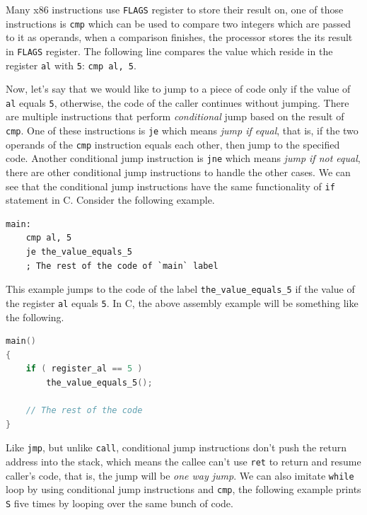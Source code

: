 Many x86 instructions use \lstinline!FLAGS! register to store their
result on, one of those instructions is \lstinline!cmp! which can be
used to compare two integers which are passed to it as operands, when a
comparison finishes, the processor stores the its result in
\lstinline!FLAGS! register. The following line compares the value which
reside in the register \lstinline!al! with \lstinline!5!:
\lstinline!cmp al, 5!.

Now, let's say that we would like to jump to a piece of code only if the
value of \lstinline!al! equals \lstinline!5!, otherwise, the code of the
caller continues without jumping. There are multiple instructions that
perform \emph{conditional} jump based on the result of \lstinline!cmp!.
One of these instructions is \lstinline!je! which means \emph{jump if
equal}, that is, if the two operands of the \lstinline!cmp! instruction
equals each other, then jump to the specified code. Another conditional
jump instruction is \lstinline!jne! which means \emph{jump if not
equal}, there are other conditional jump instructions to handle the
other cases. We can see that the conditional jump instructions have the
same functionality of \lstinline!if! statement in C. Consider the
following example.

\begin{lstlisting}
main:
    cmp al, 5
    je the_value_equals_5
    ; The rest of the code of `main` label
\end{lstlisting}

This example jumps to the code of the label
\lstinline!the_value_equals_5! if the value of the register
\lstinline!al! equals \lstinline!5!. In C, the above assembly example
will be something like the following.

\begin{lstlisting}[language=C]
main() 
{
    if ( register_al == 5 )
        the_value_equals_5();

    // The rest of the code
}
\end{lstlisting}

Like \lstinline!jmp!, but unlike \lstinline!call!, conditional jump
instructions don't push the return address into the stack, which means
the callee can't use \lstinline!ret! to return and resume caller's code,
that is, the jump will be \emph{one way jump}. We can also imitate
\lstinline!while! loop by using conditional jump instructions and
\lstinline!cmp!, the following example prints \lstinline!S! five times
by looping over the same bunch of code.

